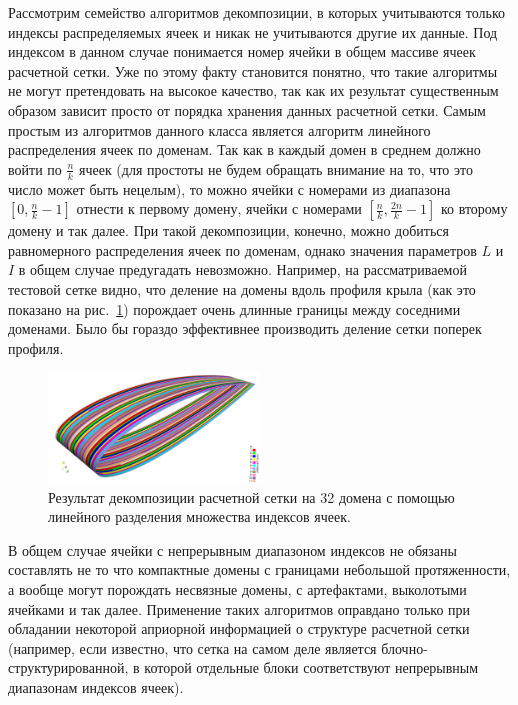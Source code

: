 Рассмотрим семейство алгоритмов декомпозиции, в которых учитываются только индексы распределяемых ячеек и никак не учитываются другие их данные.
Под индексом в данном случае понимается номер ячейки в общем массиве ячеек расчетной сетки.
Уже по этому факту становится понятно, что такие алгоритмы не могут претендовать на высокое качество, так как их результат существенным образом зависит просто от порядка хранения данных расчетной сетки.
Самым простым из алгоритмов данного класса является алгоритм линейного распределения ячеек по доменам.
Так как в каждый домен в среднем должно войти по $\frac{n}{k}$ ячеек (для простоты не будем обращать внимание на то, что это число может быть нецелым), то можно ячейки с номерами из диапазона $[0, \frac{n}{k} - 1]$ отнести к первому домену, ячейки с номерами $[\frac{n}{k}, \frac{2n}{k} - 1]$ ко второму домену и так далее.
При такой декомпозиции, конечно, можно добиться равномерного распределения ячеек по доменам, однако значения параметров $L$ и $I$ в общем случае предугадать невозможно.
Например, на рассматриваемой тестовой сетке видно, что деление на домены вдоль профиля крыла (как это показано на рис.~\ref{fig:text_2_decompsurf_wing_linear_32}) порождает очень длинные границы между соседними доменами.
Было бы гораздо эффективнее производить деление сетки поперек профиля.

\begin{figure}[ht]
	\centering
	\includegraphics[width=0.5\textwidth]{./pics/text_2_decompsurf/wing_linear_32.png}
	\caption{Результат декомпозиции расчетной сетки на 32 домена с помощью линейного разделения множества индексов ячеек.}
	\label{fig:text_2_decompsurf_wing_linear_32}
\end{figure}

В общем случае ячейки с непрерывным диапазоном индексов не обязаны составлять не то что компактные домены с границами небольшой протяженности, а вообще могут порождать несвязные домены, с артефактами, выколотыми ячейками и так далее.
Применение таких алгоритмов оправдано только при обладании некоторой априорной информацией о структуре расчетной сетки (например, если известно, что сетка на самом деле является блочно-структурированной, в которой отдельные блоки соответствуют непрерывным диапазонам индексов ячеек).

